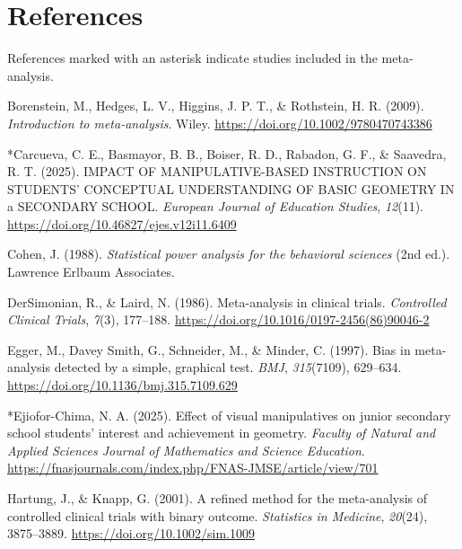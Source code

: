 \documentclass[man,a4paper,12pt,floatsintext,nolmodern,notab]{apa7}
\begin{document}
\section{References}
\noindent References marked with an asterisk indicate studies included in the meta-analysis.\par
\par\noindent\hangindent=0.5in Borenstein, M., Hedges, L. V., Higgins, J. P. T., \& Rothstein, H. R. (2009). \textit{Introduction to meta-analysis}. Wiley. \url{https://doi.org/10.1002/9780470743386}\par
\par\noindent\hangindent=0.5in *Carcueva, C. E., Basmayor, B. B., Boiser, R. D., Rabadon, G. F., \& Saavedra, R. T. (2025). IMPACT OF MANIPULATIVE-BASED INSTRUCTION ON STUDENTS’ CONCEPTUAL UNDERSTANDING OF BASIC GEOMETRY IN a SECONDARY SCHOOL. \textit{European Journal of Education Studies}, \textit{12}(11). \url{https://doi.org/10.46827/ejes.v12i11.6409}\par
\par\noindent\hangindent=0.5in Cohen, J. (1988). \textit{Statistical power analysis for the behavioral sciences} (2nd ed.). Lawrence Erlbaum Associates.\par
\par\noindent\hangindent=0.5in DerSimonian, R., \& Laird, N. (1986). Meta-analysis in clinical trials. \textit{Controlled Clinical Trials}, \textit{7}(3), 177–188. \url{https://doi.org/10.1016/0197-2456(86)90046-2}\par
\par\noindent\hangindent=0.5in Egger, M., Davey Smith, G., Schneider, M., \& Minder, C. (1997). Bias in meta-analysis detected by a simple, graphical test. \textit{BMJ}, \textit{315}(7109), 629–634. \url{https://doi.org/10.1136/bmj.315.7109.629}\par
\par\noindent\hangindent=0.5in *Ejiofor-Chima, N. A. (2025). Effect of visual manipulatives on junior secondary school students’ interest and achievement in geometry. \textit{Faculty of Natural and Applied Sciences Journal of Mathematics and Science Education}. \url{https://fnasjournals.com/index.php/FNAS-JMSE/article/view/701}\par
\par\noindent\hangindent=0.5in Hartung, J., \& Knapp, G. (2001). A refined method for the meta-analysis of controlled clinical trials with binary outcome. \textit{Statistics in Medicine}, \textit{20}(24), 3875–3889. \url{https://doi.org/10.1002/sim.1009}\par
\end{document}
